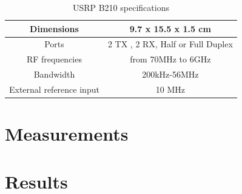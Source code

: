 \begin{table}[]
	\caption{USRP B210 specifications}
	\begin{tabular}[h]{|c|c|}
		\hline
		Dimensions & 9.7 x 15.5 x 1.5 cm \\
		\hline
		Ports &
		2 TX , 2 RX, Half  or Full Duplex\\
		\hline
		RF frequencies & from 70MHz to 6GHz\\
		\hline
		Bandwidth & 200kHz-56MHz\\
		\hline 
		External reference input & 10 MHz \\
		\hline
	\end{tabular}
\label{tab:USRP B210 specifications}
\end{table}


\section{Measurements}



\section{Results}
